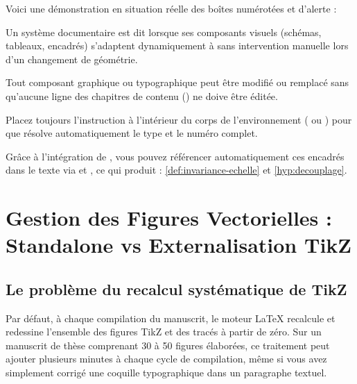 Voici une démonstration en situation réelle des boîtes numérotées et d'alerte :

\begin{definitionbox}
\label{def:invariance-echelle}
Un système documentaire est dit  lorsque ses composants visuels (schémas, tableaux, encadrés) s'adaptent dynamiquement à  sans intervention manuelle lors d'un changement de géométrie.
\end{definitionbox}

\begin{hypothesis}
\label{hyp:decouplage}
Tout composant graphique ou typographique peut être modifié ou remplacé
sans qu'aucune ligne des chapitres de contenu () ne doive être éditée.
\end{hypothesis}

\begin{attentionbox}
Placez toujours l'instruction  à l'intérieur du corps de l'environnement ( ou ) pour que  résolve automatiquement le type et le numéro complet.
\end{attentionbox}

Grâce à l'intégration de , vous pouvez référencer automatiquement ces encadrés dans le texte
via  et , ce qui produit : \cref{def:invariance-echelle} et \cref{hyp:decouplage}.

\section{Gestion des Figures Vectorielles : Standalone vs Externalisation TikZ}
\label{sec:figures-tikz}

\subsection{Le problème du recalcul systématique de TikZ}
Par défaut, à chaque compilation du manuscrit, le moteur \LaTeX{} recalcule et redessine l'ensemble
des figures TikZ et des tracés  à partir de zéro.
Sur un manuscrit de thèse comprenant 30 à 50 figures élaborées,
ce traitement peut ajouter plusieurs minutes à chaque cycle de compilation,
même si vous avez simplement corrigé une coquille typographique dans un paragraphe textuel.

